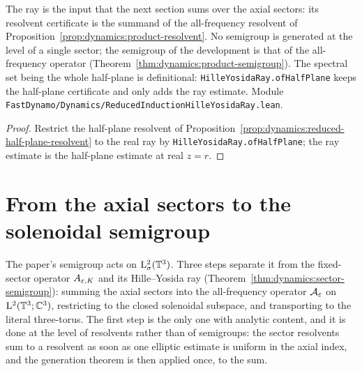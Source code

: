 The ray is the input that the next section sums over the axial sectors: its resolvent
certificate is the summand of the all-frequency resolvent of
Proposition~\ref{prop:dynamics:product-resolvent}.  No semigroup is generated at the level
of a single sector; the semigroup of the development is that of the all-frequency operator
(Theorem~\ref{thm:dynamics:product-semigroup}).  The spectral set being the whole
half-plane is definitional: \texttt{HilleYosidaRay.ofHalfPlane} keeps the half-plane
certificate and only adds the ray estimate.  Module
\texttt{FastDynamo/Dynamics/ReducedInductionHilleYosidaRay.lean}.

\begin{proof}
  \leanok
  Restrict the half-plane resolvent of
  Proposition~\ref{prop:dynamics:reduced-half-plane-resolvent} to the real ray by
  \texttt{HilleYosidaRay.ofHalfPlane}; the ray estimate is the half-plane estimate at real
  $z=r $.
\end{proof}

\section{From the axial sectors to the solenoidal semigroup}
\label{sec:dynamics:solenoidal}

The paper's semigroup acts on $\mathrm{L}^2_\sigma(\mathbb{T}^3) $.  Three steps separate it from the
fixed-sector operator $A_{\varepsilon,K} $ and its Hille--Yosida ray
(Theorem~\ref{thm:dynamics:sector-semigroup}): summing the axial
sectors into the all-frequency operator $\mathcal A_\varepsilon $ on $\mathrm{L}^2(\mathbb{T}^3;\mathbb{C}^3) $,
restricting to the closed solenoidal subspace, and transporting to the literal three-torus.
The first step is the only one with analytic content, and it is done at the level of
resolvents rather than of semigroups: the sector resolvents sum to a resolvent as soon as
one elliptic estimate is uniform in the axial index, and the generation theorem is then
applied once, to the sum.

